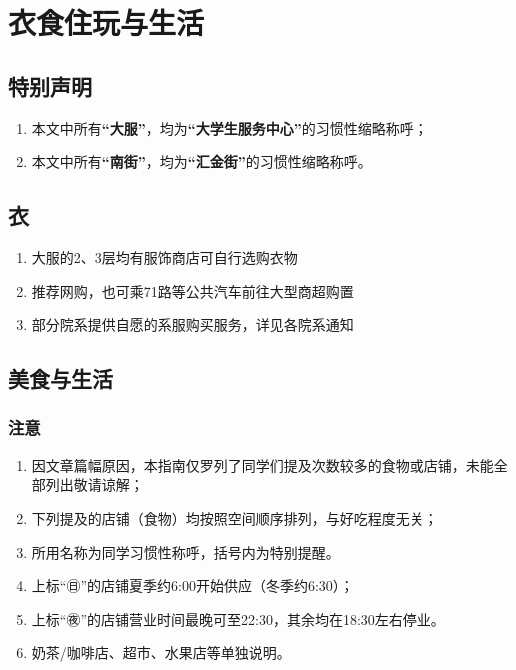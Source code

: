 \chapter[衣食住玩与生活]{衣食住玩与生活}
\section*{特别声明}
\begin{enumerate}
    \item 本文中所有\textbf{“大服”}，均为\textbf{“大学生服务中心”}的习惯性缩略称呼；
    \item 本文中所有\textbf{“南街”}，均为\textbf{“汇金街”}的习惯性缩略称呼。
\end{enumerate}
\section[衣]{衣}
\begin{enumerate}
    \item 大服的2、3层均有服饰商店可自行选购衣物
    \item 推荐网购，也可乘71路等公共汽车前往大型商超购置
    \item 部分院系提供自愿的系服购买服务，详见各院系通知
\end{enumerate}

\section[美食与生活]{美食与生活}

\subsection*{注意}
\begin{enumerate}
    \item 因文章篇幅原因，本指南仅罗列了同学们提及次数较多的食物或店铺，未能全部列出敬请谅解；
    \item 下列提及的店铺（食物）均按照空间顺序排列，与好吃程度无关；
    \item 所用名称为同学习惯性称呼，括号内为特别提醒。
    \item 上标“㊐”的店铺夏季约6:00开始供应（冬季约6:30）；
    \item 上标“㊰”的店铺营业时间最晚可至22:30，其余均在18:30左右停业。
    \item 奶茶/咖啡店、超市、水果店等单独说明。
\end{enumerate}

